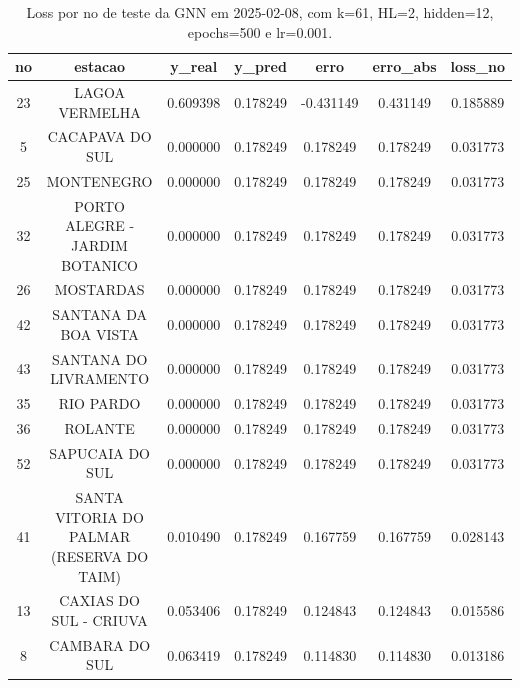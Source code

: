 \begin{table}[h]
\centering
\caption{Loss por no de teste da GNN em 2025-02-08, com k=61, HL=2, hidden=12, epochs=500 e lr=0.001.}
\label{tab:gnn_loss_k61_hl2_h12_e500_d20250208}
\begin{tabular}{ccccccc}
\toprule
no & estacao & y\_real & y\_pred & erro & erro\_abs & loss\_no \\
\midrule
23 & LAGOA VERMELHA & 0.609398 & 0.178249 & -0.431149 & 0.431149 & 0.185889 \\
5 & CACAPAVA DO SUL & 0.000000 & 0.178249 & 0.178249 & 0.178249 & 0.031773 \\
25 & MONTENEGRO & 0.000000 & 0.178249 & 0.178249 & 0.178249 & 0.031773 \\
32 & PORTO ALEGRE - JARDIM BOTANICO & 0.000000 & 0.178249 & 0.178249 & 0.178249 & 0.031773 \\
26 & MOSTARDAS & 0.000000 & 0.178249 & 0.178249 & 0.178249 & 0.031773 \\
42 & SANTANA DA BOA VISTA & 0.000000 & 0.178249 & 0.178249 & 0.178249 & 0.031773 \\
43 & SANTANA DO LIVRAMENTO & 0.000000 & 0.178249 & 0.178249 & 0.178249 & 0.031773 \\
35 & RIO PARDO & 0.000000 & 0.178249 & 0.178249 & 0.178249 & 0.031773 \\
36 & ROLANTE & 0.000000 & 0.178249 & 0.178249 & 0.178249 & 0.031773 \\
52 & SAPUCAIA DO SUL & 0.000000 & 0.178249 & 0.178249 & 0.178249 & 0.031773 \\
41 & SANTA VITORIA DO PALMAR (RESERVA DO TAIM) & 0.010490 & 0.178249 & 0.167759 & 0.167759 & 0.028143 \\
13 & CAXIAS DO SUL - CRIUVA & 0.053406 & 0.178249 & 0.124843 & 0.124843 & 0.015586 \\
8 & CAMBARA DO SUL & 0.063419 & 0.178249 & 0.114830 & 0.114830 & 0.013186 \\
\bottomrule
\end{tabular}
\end{table}
